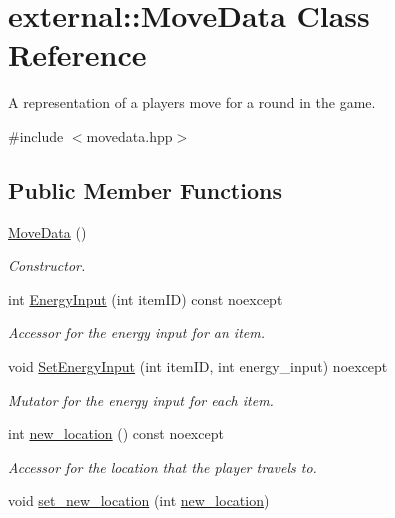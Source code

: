 \hypertarget{classexternal_1_1_move_data}{}\section{external\+:\+:Move\+Data Class Reference}
\label{classexternal_1_1_move_data}


A representation of a player\textquotesingle{}s move for a round in the game.  




{\ttfamily \#include $<$movedata.\+hpp$>$}

\subsection*{Public Member Functions}
\begin{DoxyCompactItemize}
\item 
\hyperlink{classexternal_1_1_move_data_a230c2389b03633b6b02928a867f59f27}{Move\+Data} ()
\begin{DoxyCompactList}\small\item\em Constructor. \end{DoxyCompactList}\item 
int \hyperlink{classexternal_1_1_move_data_adec73e4cffd6895b046411a25aa516ff}{Energy\+Input} (int item\+ID) const noexcept
\begin{DoxyCompactList}\small\item\em Accessor for the energy input for an item. \end{DoxyCompactList}\item 
void \hyperlink{classexternal_1_1_move_data_a9e15f73abac9be9eeeb4e8f702af05f8}{Set\+Energy\+Input} (int item\+ID, int energy\+\_\+input) noexcept
\begin{DoxyCompactList}\small\item\em Mutator for the energy input for each item. \end{DoxyCompactList}\item 
int \hyperlink{classexternal_1_1_move_data_a2469eb5c4a210b6ebd769254f190ad7e}{new\+\_\+location} () const noexcept
\begin{DoxyCompactList}\small\item\em Accessor for the location that the player travels to. \end{DoxyCompactList}\item 
void \hyperlink{classexternal_1_1_move_data_a81e78c6507a8cb0be615b23e9c94b7f4}{set\+\_\+new\+\_\+location} (int \hyperlink{classexternal_1_1_move_data_a2469eb5c4a210b6ebd769254f190ad7e}{new\+\_\+location})

\end{DoxyCompactItemize}
